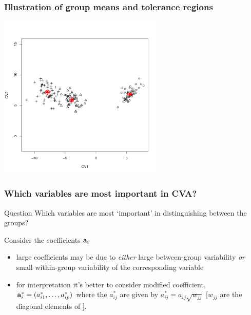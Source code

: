 \documentclass{beamer}
\begin{document}
\begin{frame}
  \frametitle{Illustration of group means and tolerance regions}

\begin{center}
\includegraphics[height=3.1in]{iris-CVA-meantol}
\end{center}

\end{frame}


\begin{frame}
  \frametitle{Which variables are most important in CVA?}

\begin{block}{Question}
Which variables are most `important' in distinguishing between the groups?
\end{block}

Consider the coefficients $\mathbf{a}_i$
\begin{itemize}
\item large coefficients may be due to \emph{either} large between-group variability \emph{or} small within-group variability of the corresponding variable
\item for interpretation it's better to consider modified coefficient, $\mathbf{a}_{i}^{*} = (a_{i1}^{*},\ldots,a_{ip}^{*})$ where the $a_{ij}^{*}$ are given by $a_{ij}^{*} = a_{ij}\sqrt{w_{jj}}$ [$w_{jj}$ are the diagonal elements of ].
\end{itemize}

\end{frame}


%
%
\end{document}
